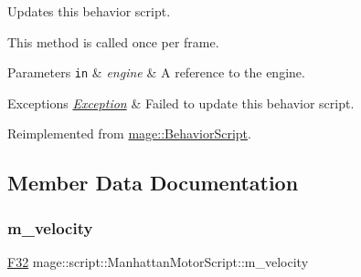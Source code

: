 Updates this behavior script.

This method is called once per frame.


\begin{DoxyParams}[1]{Parameters}
\mbox{\tt in}  & {\em engine} & A reference to the engine. \\
\hline
\end{DoxyParams}

\begin{DoxyExceptions}{Exceptions}
{\em \mbox{\hyperlink{classmage_1_1_exception}{Exception}}} & Failed to update this behavior script. \\
\hline
\end{DoxyExceptions}


Reimplemented from \mbox{\hyperlink{classmage_1_1_behavior_script_a085634661326b59850c1111e537baa4e}{mage\+::\+Behavior\+Script}}.



\subsection{Member Data Documentation}
\mbox{\label{classmage_1_1script_1_1_manhattan_motor_script_a38cdef10269075f08f3fcdc9ed8bc520}} 
\subsubsection{\texorpdfstring{m\+\_\+velocity}{m\_velocity}}
{\footnotesize\ttfamily \mbox{\hyperlink{namespacemage_aa97e833b45f06d60a0a9c4fc22ae02c0}{F32}} mage\+::script\+::\+Manhattan\+Motor\+Script\+::m\+\_\+velocity\hspace{0.3cm}{\ttfamily [private]}}

